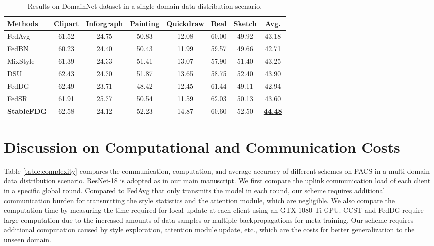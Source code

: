 \documentclass{article}
\theoremstyle{plain}
\theoremstyle{definition}
\theoremstyle{remark}
\begin{document}
\begin{table}[!h]
\small
\centering
	\begin{tabular}{l|    cccccc | c}
		\toprule  
		Methods   &Clipart  & Inforgraph & Painting & Quickdraw &Real &Sketch & Avg. \\ 
		\midrule	
		FedAvg  \cite{mcmahan2017communication}  &61.52 &24.75 &50.83&12.08&60.00 &49.92& 43.18\\
		FedBN \cite{lifedbn} &60.23& 24.40& 50.43& 11.99& 59.57& 49.66& 42.71  \\	
		MixStyle  \cite{zhou2021domain}  & 61.39& 24.33& 51.41& 13.07& 57.90& 51.40& 43.25 \\
		DSU  \cite{li2022uncertainty}   & 62.43& 24.30& 51.87& 13.65& 58.75& 52.40& 43.90  \\
		FedDG  \cite{liu2021feddg}    &62.49& 23.71& 48.42& 12.45& 61.44& 49.11& 42.94  \\
		FedSR  \cite{nguyen2022fedsr}  & 61.91& 25.37& 50.54& 11.59& 62.03& 50.13& 43.60  \\
		\textbf{StableFDG} & 62.58& 24.12& 52.23& 14.87& 60.60& 52.50& \textbf{\underline{44.48}}   \\
		\bottomrule
	\end{tabular}
\vspace{+3mm}
\caption{Results on DomainNet dataset in a single-domain data distribution scenario. } 
\label{table:domainnet}
\end{table} 



\section{Discussion on Computational and Communication Costs}
Table \ref{table:complexity} compares the communication, computation, and average accuracy  of different schemes on PACS in a multi-domain data distribution scenario. ResNet-18 is adopted as in our main manuscript. We first compare the uplink communication load of each client in a specific global round. Compared to FedAvg that only transmits the model in each round, our scheme requires additional communication burden for transmitting the style statistics and the attention module, which are negligible. We also compare the computation time by measuring the time required for local update at each client using an GTX 1080 Ti GPU. CCST \cite{chen2023federated} and FedDG \cite{liu2021feddg} require large  computation due to the increased amounts of data samples or multiple backpropagations for meta training. Our scheme requires additional computation caused by style exploration, attention module update, etc., which are the costs for better generalization to the unseen domain.
\end{document}
